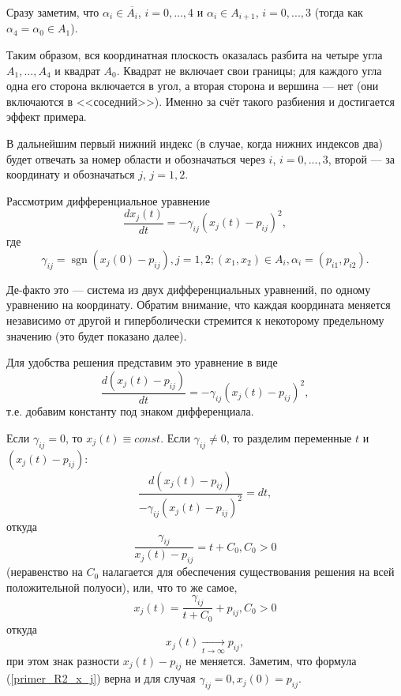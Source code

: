 Сразу заметим, что $\alpha_i \in \overline{A_i}$, $i=0,...,4$ и
$\alpha_i \in A_{i+1}$, $i=0,...,3$ (тогда как $\alpha_4 = \alpha_0 \in A_{1}$).

Таким образом, вся координатная плоскость оказалась разбита на четыре угла $A_1, ..., A_4$ и квадрат $A_0$.
Квадрат не включает свои границы; для каждого угла одна его сторона включается в угол,
а вторая сторона и вершина --- нет (они включаются в <<соседний>>).
Именно за счёт такого разбиения и достигается эффект примера.

В дальнейшим первый нижний индекс (в случае, когда нижних индексов два)
будет отвечать за номер области и обозначаться через $i$,
$i=0, ..., 3$, второй --- за координату и обозначаться $j$, $j=1, 2$.

Рассмотрим дифференциальное уравнение
\begin{equation}\label{difur_primer_R2}
	\frac{dx_j(t)}{dt} = -\gamma_{ij}(x_j(t)-p_{ij})^2,
\end{equation}
где
$$
	\gamma_{ij} = \operatorname{sgn}(x_j(0)-p_{ij}), j=1,2;
	(x_1, x_2) \in A_i,  \alpha_i = (p_{i1},p_{i2}).
$$

Де-факто это --- система из двух дифференциальных уравнений, по одному уравнению на координату.
Обратим внимание, что каждая координата меняется независимо от другой и гиперболически стремится
к некоторому предельному значению (это будет показано далее).

Для удобства решения представим это уравнение в виде
\begin{equation*}
	\frac{d(x_j(t) - p_{ij})}{dt} = -\gamma_{ij}(x_j(t)-p_{ij})^2,
\end{equation*}
т.е. добавим константу под знаком дифференциала.

Если $\gamma_{ij} = 0$, то $x_j(t) \equiv const$.
Если $\gamma_{ij} \neq 0$, то разделим переменные $t$ и $(x_j(t) - p_{ij})$:
\begin{equation*}
	\frac{d(x_j(t) - p_{ij})}{-\gamma_{ij}(x_j(t)-p_{ij})^2} = dt ,
\end{equation*}
откуда
\begin{equation*}
	\frac{\gamma_{ij}}{x_j(t)-p_{ij}} = t+C_0, C_0 > 0
\end{equation*}
(неравенство на $C_0$ налагается для обеспечения существования решения на всей положительной полуоси),
или, что то же самое,
\begin{equation}\label{primer_R2_x_j}
	x_j(t) = \frac{\gamma_{ij}}{t+C_0}+p_{ij}, C_0 > 0
\end{equation}
откуда
\begin{equation*}
	x_j(t) \xrightarrow[t\to \infty ]{}{p_{ij}},
\end{equation*}
при этом знак разности $x_j(t) - p_{ij}$ не меняется.
Заметим, что формула (\ref{primer_R2_x_j}) верна и для случая $\gamma_{ij}=0, x_j(0)=p_{ij}$.

